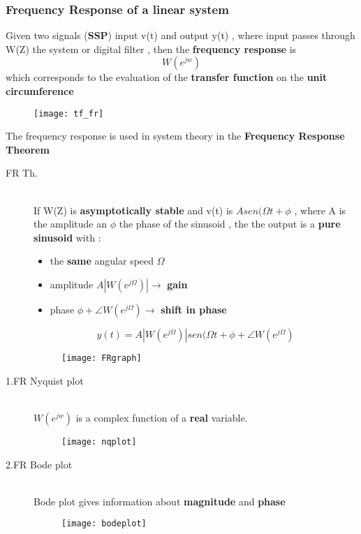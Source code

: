 \subsubsection{Frequency Response of a linear system}
Given two signals (\textbf{SSP}) input v(t) and output y(t) , where input passes through W(Z) the system or digital filter , then the \textbf{frequency response} is 
$$ W(e^{jw})$$ which corresponds to the evaluation of the \textbf{transfer function} on the \textbf{unit circumference } 
\begin{figure}[H]
 \centering
  \texttt{[image: tf\_fr]}
\end{figure}
The frequency response is used in system theory in the \textbf{Frequency Response Theorem}
\begin{description}
\item[FR Th.]\hfill\\
If W(Z) is \textbf{asymptotically stable} and v(t) is $Asen(\Omega t + \phi $ , where
A is the amplitude an $\phi$ the phase of the sinusoid , the the output is a \textbf{pure sinusoid} with :
\newpage
\begin{itemize}
\item the \textbf{same} angular speed $\Omega$
\item amplitude $A|W(e^{j\Omega})| \to$  \textbf{gain}
\item phase $\phi +\angle W(e^{j\Omega})\to $ \textbf{shift in phase}
\end{itemize}
\[
 \boxed{y(t) =A|W(e^{j\Omega})| sen(\Omega t + \phi + \angle W(e^{j\Omega}) }
\]

\begin{figure}[H]
 \centering
  \texttt{[image: FRgraph]}
\end{figure}

\item[1.FR Nyquist plot]\hfill\\
$W(e^{jw})$ is a complex function of a \textbf{real} variable.\\
\begin{figure}[H]
 \centering
  \texttt{[image: nqplot]}
\end{figure}
\newpage
\item[2.FR Bode plot]\hfill\\
Bode plot gives information about \textbf{magnitude} and \textbf{phase}
\begin{figure}[H]
 \centering
  \texttt{[image: bodeplot]}
\end{figure}
\end{description}

